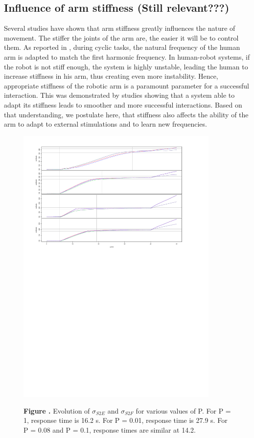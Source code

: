 \subsection{Influence of arm stiffness (Still relevant???)}
Several studies have shown that arm stiffness greatly influences the nature of movement. The stiffer the joints of the arm are, the easier it will be to control them. As reported in \cite{bennett1992time}, during cyclic tasks, the natural frequency of the human arm is adapted to match the first harmonic frequency. In human-robot systems, if the robot is not stiff enough, the system is highly unstable, leading the human to increase stiffness in his arm, thus creating even more instability. Hence, appropriate stiffness of the robotic arm is a paramount parameter for a successful interaction. This was demonstrated by studies showing that a system able to adapt its stiffness leads to smoother and more successful interactions. Based on that understanding, we postulate here, that stiffness also affects the ability of the arm to adapt to external stimulations and to learn new frequencies. 

\begin{figure}[h!]
\begin{center}
\includegraphics[width=10cm]{figures/simulation/varying_P}
\end{center}
\textbf{\label{fig:20} Figure .} {Evolution of $\sigma_{S2E}$ and $\sigma_{S2F}$ for various values of P. For P = 1, response time is 16.2 s. For P = 0.01, response time is 27.9 s. For P = 0.08 and P = 0.1, response times are similar at 14.2.}
\end{figure}

